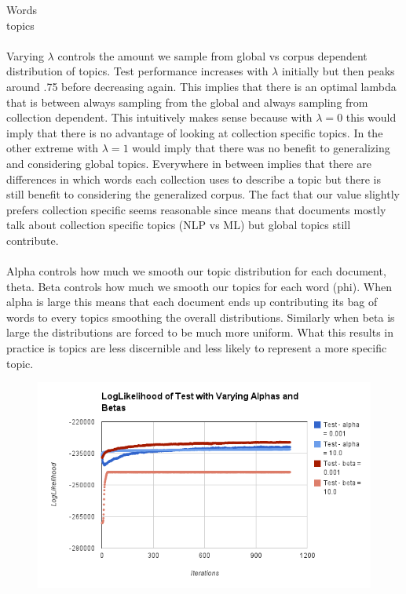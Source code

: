 \documentclass[12pt]{article}
\begin{document}
 Words \\
 topics \\
\\
 Varying $\lambda$ controls the amount we sample from global vs corpus dependent distribution of topics. Test performance increases with $\lambda$ initially but then peaks around .75 before decreasing again. This implies that there is an optimal lambda that is between always sampling from the global and always sampling from collection dependent. This intuitively makes sense because with $\lambda = 0$ this would imply that there is no advantage of looking at collection specific topics. In the other extreme with $\lambda=1$ would imply that there was no benefit to generalizing and considering global topics. Everywhere in between implies that there are differences in which words each collection uses to describe a topic but there is still benefit to considering the generalized corpus. The fact that our value slightly prefers collection specific seems reasonable since means that documents mostly talk about collection specific topics (NLP vs ML) but global topics still contribute. 
 \\
\\
 Alpha controls how much we smooth our topic distribution for each document, theta. Beta controls how much we smooth our topics for each word (phi). When alpha is large this means that each document ends up contributing its bag of words to every topics smoothing the overall distributions. Similarly when beta is large the distributions are forced to be much more uniform. What this results in practice is topics are less discernible and less likely to represent a more specific topic. \\

\begin{figure}[H]
\centering
\includegraphics[keepaspectratio=true,scale=0.8]{charts/VaryingAlphasBetasOnTest}
\label{alphaBetaVariation}
\end{figure}
\end{document}
